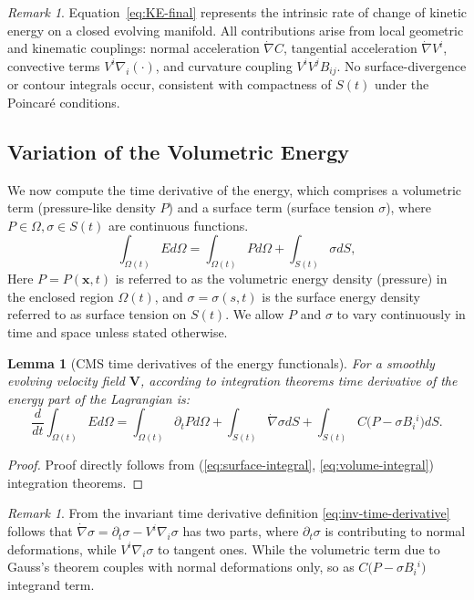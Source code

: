 \documentclass[11pt]{article}
\newcommand{\bV}{\mathbf{V}}
\theoremstyle{definition}
\theoremstyle{plain}
\newtheorem{lemma}[definition]{Lemma}
\theoremstyle{remark}
\newtheorem{remark}[definition]{Remark}
\begin{document}
\begin{remark}
Equation~\eqref{eq:KE-final} represents the intrinsic rate of change of kinetic energy on a closed evolving manifold.  
All contributions arise from local geometric and kinematic couplings: 
normal acceleration $\dot{\nabla}C$, tangential acceleration $\dot{\nabla}V^i$, convective terms $V^i\nabla_i(\cdot)$, and curvature coupling $V^iV^jB_{ij}$.  
No surface-divergence or contour integrals occur, consistent with compactness of $S(t)$ under the Poincaré conditions.
\end{remark}

\subsection{Variation of the Volumetric Energy}\label{subsec:energy-balance}

We now compute the time derivative of the energy, which comprises a volumetric term (pressure-like density $P$) and a surface term (surface tension $\sigma$), where $P\in\Omega, \sigma\in S(t)$ are continuous functions.
\begin{equation}
\label{eq:U-def}
\int_{\Omega(t)} Ed\Omega=\int_{\Omega(t)} Pd\Omega+\int_{S(t)} \sigma dS,
\end{equation}
Here $P=P(\mathbf{x},t)$ is referred to as the volumetric energy density (pressure) in the enclosed region $\Omega(t)$, and $\sigma=\sigma(s,t)$ is the surface energy density referred to as surface tension on $S(t)$. We allow $P$ and $\sigma$ to vary continuously in time and space unless stated otherwise.

\begin{lemma}[CMS time derivatives of the energy functionals]\label{lem:energy-time-derivs}
For a smoothly evolving velocity field $\bV$, according to integration theorems time derivative of the energy part of the Lagrangian is:
\begin{equation}
\label{eq:pot-variation}
\frac{d}{dt}\int_{\Omega(t)} Ed\Omega
= \int_{\Omega(t)} \partial_t Pd\Omega
   +\int_{S(t)} \dot{\nabla}\sigma dS
   +\int_{S(t)} C\bigl(P-\sigma B_i{}^{i}\bigr)dS.
\end{equation}
\end{lemma}
\begin{proof} Proof directly follows from (\ref{eq:surface-integral}, \ref{eq:volume-integral}) integration theorems.
\end{proof} 
\begin{remark}
From the invariant time derivative definition \eqref{eq:inv-time-derivative} follows that $\dot\nabla\sigma=\partial_t\sigma-V^i\nabla_i\sigma$ has two parts, where $\partial_t \sigma$ is contributing to normal deformations, while $V^i\nabla_i\sigma$ to tangent ones. While the volumetric term due to Gauss's theorem couples with normal deformations only, so as $C\bigl(P-\sigma B_i{}^{i}\bigr)$ integrand term.
\end{remark}
\end{document}
